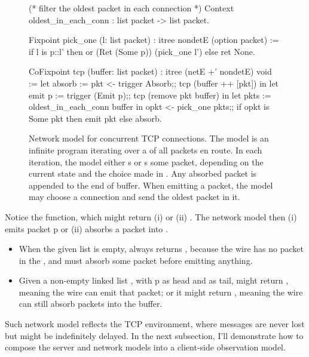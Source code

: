 \begin{figure}
\begin{coq}
(* filter the oldest packet in each connection *)
Context oldest_in_each_conn : list packet -> list packet.

Fixpoint pick_one (l: list packet) : itree nondetE (option packet) :=%
  if l is p::l'
  then or (Ret (Some p)) (pick_one l')
  else ret None.

CoFixpoint tcp (buffer: list packet) : itree (netE +' nondetE) void :=
  let absorb := pkt <- trigger Absorb;;
                tcp (buffer ++ [pkt])      in
  let emit p := trigger (Emit p);;
                tcp (remove pkt buffer)    in
  let pkts   := oldest_in_each_conn buffer in
  opkt <- pick_one pkts;;
  if opkt is Some pkt
  then emit pkt
  else absorb.
\end{coq}
\caption[Network model for concurrent TCP connections]{Network model for
  concurrent TCP connections.  The model is an infinite program iterating over a
   of all packets en route.  In each iteration, the model either
  s or s some packet, depending on the current
   state and the choice made in .  Any absorbed packet
  is appended to the end of buffer.  When emitting a packet, the model may
  choose a connection and send the oldest packet in it.}
\label{fig:tcp-model}
\end{figure}

Notice the  function, which might return (i)  or (ii)
.  The network model then (i) emits packet \ilc p or (ii) absorbs a
packet into .

\begin{itemize}
\item When the given list  is empty,  always returns
  , because the wire has no packet in the , and must
  absorb some packet before emitting anything.
\item Given a non-empty linked list , with \ilc p as head and
   as tail,  might return , meaning the wire
  can emit that packet; or it might return , meaning the wire can
  still absorb packets into the buffer.
\end{itemize}

Such network model reflects the TCP environment, where messages are never lost
but might be indefinitely delayed.  In the next subsection, I'll demonstrate how
to compose the server and network models into a client-side observation model.

